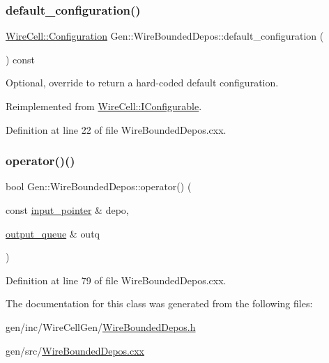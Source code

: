 \subsubsection{\texorpdfstring{default\+\_\+configuration()}{default\_configuration()}}
{\footnotesize\ttfamily \hyperlink{namespace_wire_cell_a9f705541fc1d46c608b3d32c182333ee}{Wire\+Cell\+::\+Configuration} Gen\+::\+Wire\+Bounded\+Depos\+::default\+\_\+configuration (\begin{DoxyParamCaption}{ }\end{DoxyParamCaption}) const\hspace{0.3cm}{\ttfamily [virtual]}}



Optional, override to return a hard-\/coded default configuration. 



Reimplemented from \hyperlink{class_wire_cell_1_1_i_configurable_a54841b2da3d1ea02189478bff96f7998}{Wire\+Cell\+::\+I\+Configurable}.



Definition at line 22 of file Wire\+Bounded\+Depos.\+cxx.

\mbox{\label{class_wire_cell_1_1_gen_1_1_wire_bounded_depos_a510fe7ba6ae980b5ab232dedac572c7d}} 
\subsubsection{\texorpdfstring{operator()()}{operator()()}}
{\footnotesize\ttfamily bool Gen\+::\+Wire\+Bounded\+Depos\+::operator() (\begin{DoxyParamCaption}\item[{const \hyperlink{class_wire_cell_1_1_i_queuedout_node_acf5f716a764553f3c7055a9cf67e906e}{input\+\_\+pointer} \&}]{depo,  }\item[{\hyperlink{class_wire_cell_1_1_i_queuedout_node_a39018e4e3dd886befac9636ac791a685}{output\+\_\+queue} \&}]{outq }\end{DoxyParamCaption})\hspace{0.3cm}{\ttfamily [virtual]}}



Definition at line 79 of file Wire\+Bounded\+Depos.\+cxx.



The documentation for this class was generated from the following files\+:\begin{DoxyCompactItemize}
\item 
gen/inc/\+Wire\+Cell\+Gen/\hyperlink{_wire_bounded_depos_8h}{Wire\+Bounded\+Depos.\+h}\item 
gen/src/\hyperlink{_wire_bounded_depos_8cxx}{Wire\+Bounded\+Depos.\+cxx}\end{DoxyCompactItemize}
